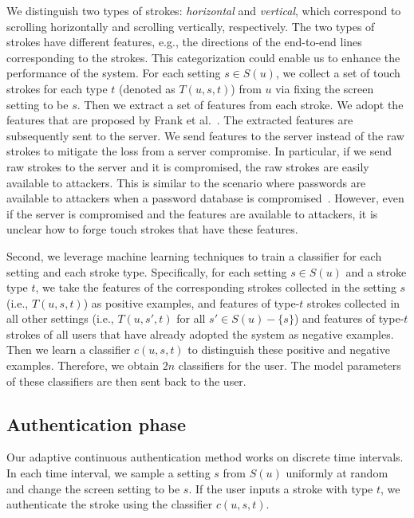 \documentclass{sig-alternate-05-2015}
\begin{document}
We distinguish two types of strokes: \emph{horizontal} and \emph{vertical}, 
which correspond to scrolling  horizontally and scrolling vertically, respectively. 
The two types of strokes have different features, e.g., the directions of the end-to-end lines corresponding to the strokes. This categorization could enable us to enhance the performance of the system.
For each setting $s\in S(u)$, we collect a set of touch strokes for each type $t$
(denoted as $T(u, s, t)$) from $u$ via fixing the screen setting to be $s$. Then we
extract a set of features from each stroke. We adopt the features that are
proposed by Frank et al.~\cite{frank2013touchalytics}. The extracted features
are subsequently sent to the server.  We send features to the server instead of
the raw strokes to mitigate the loss from a server compromise. In particular, if we send
raw strokes to the server and it is compromised, the raw strokes are easily
available to attackers. This is similar to the scenario where passwords are
available to attackers when a password database is
compromised~\cite{rockyou, CSDN}. However, even if the server is compromised and
the features are available to attackers, it is unclear how to forge touch
strokes that have these features. 

Second, we leverage machine learning techniques to train a classifier for each
setting and each stroke type. Specifically, for each setting $s\in S(u)$ and a stroke type $t$, we take the features
of the corresponding strokes collected in the setting $s$ (i.e.,  $T(u, s, t)$) as positive
examples, and features of type-$t$ strokes collected in all other settings (i.e., 
$T(u,s', t)$ for all $s'\in S(u)-\{s\}$) and features of type-$t$ strokes of all users that have already adopted the system as
negative examples. Then we learn a classifier $c(u,s,t)$ to distinguish these
positive and negative examples. Therefore, we obtain $2n$ classifiers for
the user. The model parameters of these classifiers are then sent back to
the user. 


\subsection{Authentication phase}
Our adaptive continuous authentication method works on discrete time intervals. 
In each time interval,  we sample a setting $s$ from $S(u)$
uniformly at random and change the screen setting to be $s$. If the user inputs a stroke with type $t$, we  authenticate the stroke using the classifier $c(u, s, t)$.   
\end{document}
